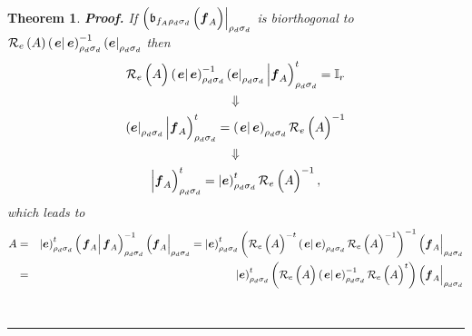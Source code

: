 \documentclass[aps,preprint]{revtex4}
\newtheorem{theorem}{Theorem}
\newenvironment{proof}[1][Proof]{\noindent\textbf{#1.} }{\ \rule{0.5em}{0.5em}}
\begin{document}
\begin{theorem}
\begin{proof}
If $\left( \mathfrak{b}_{f_{A}\rho _{d}\sigma _{d}}\left( \overset{}{%
\boldsymbol{f}_{A}}\right) \right\vert _{\rho _{d}\sigma _{d}}$ is
biorthogonal to $\mathcal{R}_{e}\left( A\right) \left( \left. \overset{}{%
\boldsymbol{e}}\right\vert \boldsymbol{e}\right) _{\rho _{d}\sigma
_{d}}^{-1}\left( \overset{}{\boldsymbol{e}}\right\vert _{\rho _{d}\sigma
_{d}}$ then 
\begin{gather}
\mathcal{R}_{e}\left( \overset{}{A}\right) \left( \left. \overset{}{%
\boldsymbol{e}}\right\vert \boldsymbol{e}\right) _{\rho _{d}\sigma
_{d}}^{-1}\left( \overset{}{\boldsymbol{e}}\right\vert _{\rho _{d}\sigma
_{d}}\left\vert \overset{}{\boldsymbol{f}_{A}}\right) _{\rho _{d}\sigma
_{d}}^{t}=\mathbb{I}_{r} \\
\Downarrow \\
\left( \overset{}{\boldsymbol{e}}\right\vert _{\rho _{d}\sigma
_{d}}\left\vert \overset{}{\boldsymbol{f}_{A}}\right) _{\rho _{d}\sigma
_{d}}^{t}=\left( \left. \overset{}{\boldsymbol{e}}\right\vert \boldsymbol{e}%
\right) _{\rho _{d}\sigma _{d}}\mathcal{R}_{e}\left( \overset{}{A}\right)
^{-1} \\
\Downarrow \\
\left\vert \overset{}{\boldsymbol{f}_{A}}\right) _{\rho _{d}\sigma
_{d}}^{t}=\left\vert \overset{}{\boldsymbol{e}}\right) _{\rho _{d}\sigma
_{d}}^{t}\mathcal{R}_{e}\left( \overset{}{A}\right) ^{-1},
\end{gather}%
which leads to 
\begin{eqnarray}
A &=&\left\vert \overset{}{\boldsymbol{e}}\right) _{\rho _{d}\sigma
_{d}}^{t}\left( \left. \overset{}{\boldsymbol{f}_{A}}\right\vert \boldsymbol{%
f}_{A}\right) _{\rho _{d}\sigma _{d}}^{-1}\left( \overset{}{\boldsymbol{f}%
_{A}}\right\vert _{\rho _{d}\sigma _{d}}=\left\vert \overset{}{\boldsymbol{e}%
}\right) _{\rho _{d}\sigma _{d}}^{t}\left( \mathcal{R}_{e}\left( \overset{}{A%
}\right) ^{-t}\left( \left. \overset{}{\boldsymbol{e}}\right\vert 
\boldsymbol{e}\right) _{\rho _{d}\sigma _{d}}\mathcal{R}_{e}\left( \overset{}%
{A}\right) ^{-1}\right) ^{-1}\left( \overset{}{\boldsymbol{f}_{A}}%
\right\vert _{\rho _{d}\sigma _{d}} \\
&=&\left\vert \overset{}{\boldsymbol{e}}\right) _{\rho _{d}\sigma
_{d}}^{t}\left( \mathcal{R}_{e}\left( \overset{}{A}\right) \left( \left. 
\overset{}{\boldsymbol{e}}\right\vert \boldsymbol{e}\right) _{\rho
_{d}\sigma _{d}}^{-1}\mathcal{R}_{e}\left( \overset{}{A}\right) ^{t}\right)
\left( \overset{}{\boldsymbol{f}_{A}}\right\vert _{\rho _{d}\sigma _{d}} \\

\end{eqnarray}
\end{proof}
\end{theorem}
\end{document}
